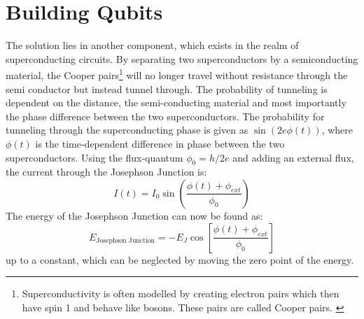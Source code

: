 \section{Building Qubits}
The solution lies in another component, which exists in the realm of superconducting circuits. By separating two superconductors by a semiconducting material, the Cooper pairs\footnote{Superconductivity is often modelled by creating electron pairs which then have spin 1 and behave like bosons. These pairs are called Cooper pairs. \cite{gennes_superconductivity_1966}} will no longer travel without resistance through the semi conductor but instead tunnel through. The probability of tunneling is dependent on the distance, the semi-conducting material and most importantly the phase difference between the two superconductors. The probability for tunneling through the superconducting phase is given as $\sin(2e\phi(t))$, where $\phi(t)$ is the time-dependent difference in phase between the two superconductors. Using the flux-quantum $\phi_0 = h / 2e$ and adding an external flux, the current through the Josephson Junction is:
\begin{equation}
    I(t) = I_0 \sin \left( \frac{\phi(t) + \phi_{ext}}{\phi_0} \right)
\end{equation}
The energy of the Josephson Junction can now be found as\cite{krantz_week_2019}: 
\begin{equation}
    E_{\text{Josephson Junction}} = - E_J \cos \left[ \frac{\phi(t) + \phi_{ext}}{\phi_0} \right]
\end{equation}
up to a constant, which can be neglected by moving the zero point of the energy. \cite{vool_introduction_2017}

